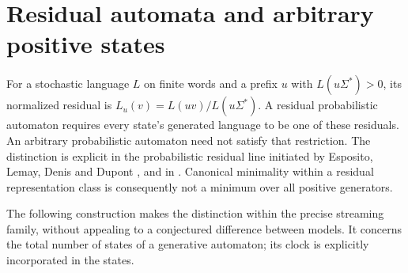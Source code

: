 \section{Residual automata and arbitrary positive states}
\label{sec:residual}
For a stochastic language $L$ on finite words and a prefix $u$ with
$L(u\Sigma^*)>0$, its normalized residual is
$L_u(v)=L(uv)/L(u\Sigma^*)$. A residual probabilistic automaton requires
every state's generated language to be one of these residuals. An
arbitrary probabilistic automaton need not satisfy that restriction.
The distinction is explicit in the probabilistic residual line initiated
by Esposito, Lemay, Denis and Dupont \cite{ELDD02}, and in
\cite[Section 2 and Propositions 16, 19]{DenisEsposito}. Canonical
minimality within a residual representation class is consequently not
a minimum over all positive generators.

The following construction makes the distinction within the precise
streaming family, without appealing to a conjectured difference between
models. It concerns the total number of states of a generative automaton;
its clock is explicitly incorporated in the states.


